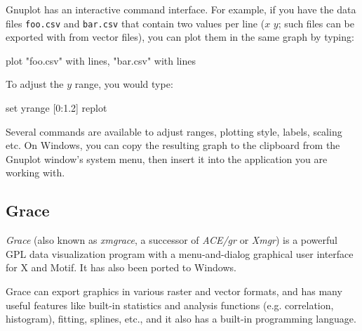 Gnuplot has an interactive command interface. For example, if you have
the data files \texttt{foo.csv} and \texttt{bar.csv} that contain
two values per line ($x$ $y$; such files can be exported with
 from vector files), you can plot them in the same
graph by typing:

\begin{commandline}
plot "foo.csv" with lines, "bar.csv" with lines
\end{commandline}

To adjust the $y$ range, you would type:

\begin{commandline}
set yrange [0:1.2]
replot
\end{commandline}

Several commands are available to adjust ranges, plotting style, labels,
scaling etc. On Windows, you can copy the resulting graph to the clipboard from
the Gnuplot window's system menu, then insert it into the application you
are working with.


\subsection{Grace}

\textit{Grace} (also known as \textit{xmgrace}, a successor of
\textit{ACE/gr} or \textit{Xmgr}) is a powerful GPL data visualization
program with a menu-and-dialog graphical user interface for X and Motif. It
has also been ported to Windows.

Grace can export graphics in various raster and vector formats, and has
many useful features like built-in statistics and analysis functions (e.g.
correlation, histogram), fitting, splines, etc., and it also has a built-in
programming language.




